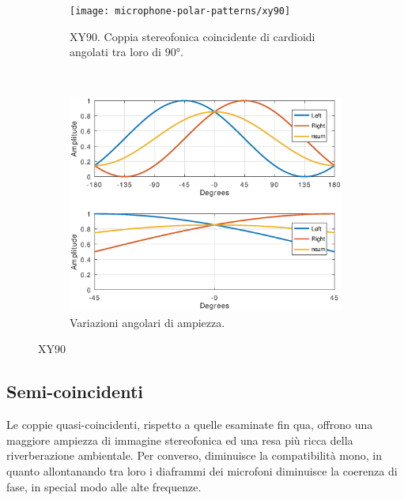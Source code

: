 \begin{figure}[t]
    \centering
    \begin{subfigure}[t]{0.99\textwidth}
        \centering
        \texttt{[image: microphone-polar-patterns/xy90]}
        \caption[]{XY90. Coppia stereofonica coincidente di cardioidi angolati tra loro di $90°$.}%
        \label{pol:xy90sp}
    \end{subfigure}%
    \\
    \begin{subfigure}[t]{0.99\textwidth}
        \centering
        \includegraphics[width=12.5cm]{CAPITOLI/1000/IMG/xy90sub}
        \caption[]{Variazioni angolari di ampiezza.}%
        \label{plot:xy90}
    \end{subfigure}
    \caption[]{XY90}
    \label{sp:xy90}
\end{figure}

\clearpage

\subsection{Semi-coincidenti}

Le coppie quasi-coincidenti, rispetto a quelle esaminate fin qua, offrono una
maggiore ampiezza di immagine stereofonica ed una resa più ricca della riverberazione
ambientale. Per converso, diminuisce la compatibilità mono, in quanto allontanando
tra loro i diaframmi dei microfoni diminuisce la coerenza di fase, in special
modo alle alte frequenze.

